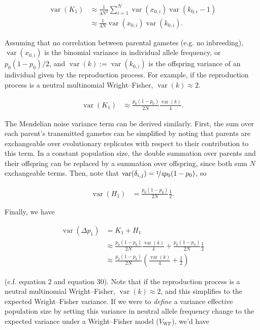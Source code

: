 \documentclass[11pt]{article}
\DeclareMathOperator{\var}{var}
\begin{document}
\begin{align}
  \var(K_1) &\approx \frac{1}{4N^2} \sum_{i=1}^N \var(x_{0,i}) \var(k_{0,i} - 1)  \\
            &\approx \frac{1}{4N} \var(x_{0,i}) \var(k_{0,i}).
\end{align}

Assuming that no correlation between parental gametes (e.g. no inbreeding),
$\var(x_{0,i})$ is the binomial variance in individual allele frequency, or
$p_0(1-p_0)/2$, and $\var(k) := \var(k_{0,i})$ is the offspring variance of an
individual given by the reproduction process. For example, if the reproduction
process is a neutral multinomial Wright--Fisher, $\var(k) \approx 2$.

\begin{align}
  \var(K_1) &\approx \frac{p_0(1-p_0)}{2N} \frac{\var(k)}{4}.
\end{align}

The Mendelian noise variance term can be derived similarly. First, the sum over
each parent's transmitted gametes can be simplified by noting that parents are
exchangeable over evolutionary replicates with respect to their contribution to
this term. In a constant population size, the double summation over parents and
their offspring can be replaced by a summation over offspring, since both sum
$N$ exchangeable terms. Then, note that $\var(\delta_{i,j}) = \nicefrac{1}{4}
p_0(1-p_0)$, so

\begin{align}
  \var(H_1) &= \frac{p_0(1-p_0)}{2N} \frac{1}{2}.
\end{align}

Finally, we have

\begin{align}
  \var(\Delta p_1) &= K_1 + H_1 \\
  &\approx \frac{p_0(1-p_0)}{2N} \frac{\var(k)}{4} + \frac{p_0(1-p_0)}{2N} \frac{1}{2} \\
                   &\approx \frac{p_0(1-p_0)}{2N}\left(\frac{\var(k)}{4} + \frac{1}{2}\right)
\end{align}

(c.f. \cite{Santiago1995-hx} equation 2 and \cite{Buffalo2019-qs} equation 30).
Note that if the reproduction process is a neutral multinomial Wright--Fisher,
$\var(k) \approx 2$, and this simplifies to the expected Wright--Fisher
variance. If we were to \emph{define} a variance effective population size by
setting this variance in neutral allele frequency change to the expected
variance under a Wright--Fisher model ($V_\text{WF}$), we'd have
\end{document}
